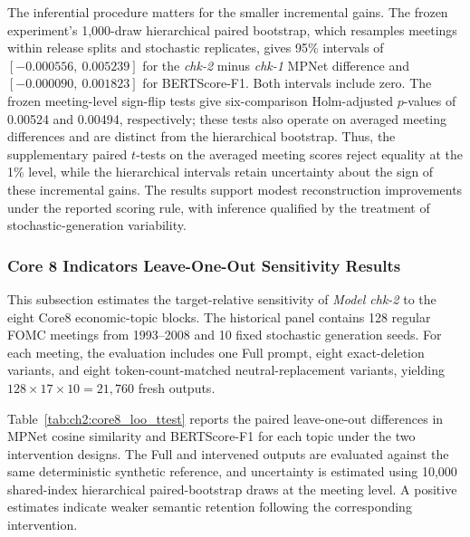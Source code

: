 The inferential procedure matters for the smaller incremental gains. The
frozen experiment's 1,000-draw hierarchical paired bootstrap, which resamples
meetings within release splits and stochastic replicates, gives 95\%
intervals of \([-0.000556,\ 0.005239]\) for the \textit{chk-2} minus
\textit{chk-1} MPNet difference and \([-0.000090,\ 0.001823]\) for
BERTScore-F1. Both intervals include zero. The frozen meeting-level
sign-flip tests give six-comparison Holm-adjusted \(p\)-values of 0.00524
and 0.00494, respectively; these tests also operate on averaged meeting
differences and are distinct from the hierarchical bootstrap. Thus, the supplementary paired
\(t\)-tests on the averaged meeting scores reject equality at the 1\%
level, while the hierarchical intervals retain uncertainty about the sign
of these incremental gains. The results support modest reconstruction
improvements under the reported scoring rule, with inference qualified by
the treatment of stochastic-generation variability.



\subsubsection*{Core 8 Indicators Leave-One-Out Sensitivity Results}

This subsection estimates the target-relative sensitivity of \textit{Model chk-2} to the eight Core8 economic-topic blocks. The historical panel contains 128 regular FOMC meetings from 1993--2008 and 10 fixed stochastic generation seeds.  For each meeting, the evaluation includes one Full prompt, eight exact-deletion variants, and eight token-count-matched neutral-replacement variants, yielding \(128 \times 17 \times 10 = 21{,}760\) fresh outputs.  


Table~\ref{tab:ch2:core8_loo_ttest} reports the paired leave-one-out differences in MPNet cosine similarity and BERTScore-F1 for each topic under the two intervention designs. The Full and intervened outputs are evaluated against the same deterministic synthetic reference, and uncertainty is estimated using 10,000 shared-index hierarchical paired-bootstrap draws at the meeting level. A positive estimates indicate weaker semantic retention following the corresponding intervention.


